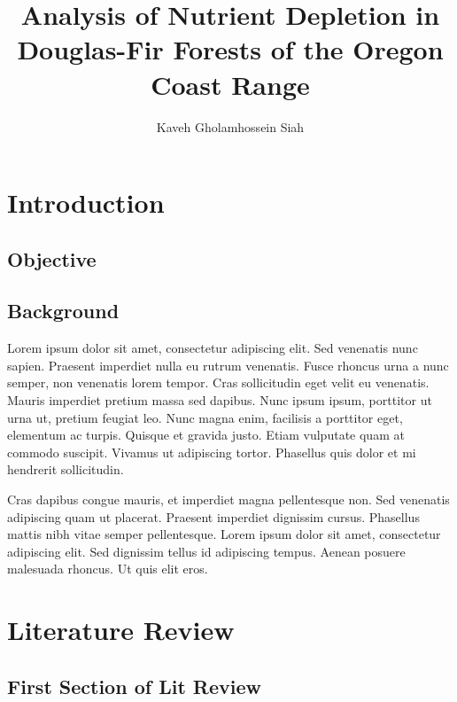 \documentclass[double,12pt]{beavtex}
\title{Analysis of Nutrient Depletion in Douglas-Fir Forests of the Oregon Coast Range}
\author{Kaveh Gholamhossein Siah}
\begin{document}
\maketitle
\mainmatter


\chapter{Introduction}



\section{Objective}





\section{Background}

Lorem ipsum dolor sit amet, consectetur adipiscing elit. Sed venenatis nunc sapien. Praesent imperdiet nulla eu rutrum venenatis. Fusce rhoncus urna a nunc semper, non venenatis lorem tempor. Cras sollicitudin eget velit eu venenatis. Mauris imperdiet pretium massa sed dapibus. Nunc ipsum ipsum, porttitor ut urna ut, pretium feugiat leo. Nunc magna enim, facilisis a porttitor eget, elementum ac turpis. Quisque et gravida justo. Etiam vulputate quam at commodo suscipit. Vivamus ut adipiscing tortor. Phasellus quis dolor et mi hendrerit sollicitudin. 

Cras dapibus congue mauris, et imperdiet magna pellentesque non. Sed venenatis adipiscing quam ut placerat. Praesent imperdiet dignissim cursus. Phasellus mattis nibh vitae semper pellentesque. Lorem ipsum dolor sit amet, consectetur adipiscing elit. Sed dignissim tellus id adipiscing tempus. Aenean posuere malesuada rhoncus. Ut quis elit eros.




\chapter{Literature Review}

\section{First Section of Lit Review}
\end{document}
